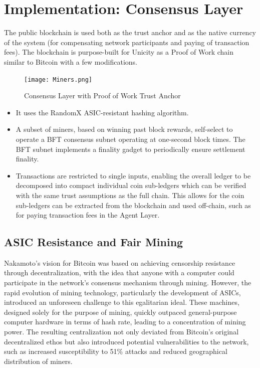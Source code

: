 \documentclass{article}
\begin{document}
\section{Implementation: Consensus Layer}

The public blockchain is used both as the trust anchor and as the native currency of the system (for compensating network participants and paying of transaction fees). The blockchain is purpose-built for Unicity as a Proof of Work chain similar to Bitcoin with a few modifications.

\begin{figure}[htbp]
    \centering
    \texttt{[image: Miners.png]}
    \caption{Consensus Layer with Proof of Work Trust Anchor}
    \label{fig:miners}
\end{figure}

\begin{itemize}
\setlength{\leftmargin}{1em}
 \item It uses the RandomX ASIC-resistant hashing algorithm.
 \item A subset of miners, based on winning past block rewards, self-select to operate a BFT consensus subnet operating at one-second block times. The BFT subnet implements a finality gadget to periodically ensure settlement finality.
 \item Transactions are restricted to single inputs, enabling the overall ledger to be decomposed into compact individual coin sub-ledgers which can be verified with the same trust assumptions as the full chain.  This allows for the coin sub-ledgers can be extracted from the blockchain and used off-chain, such as for paying transaction fees in the Agent Layer.
\end{itemize}


\subsection{ASIC Resistance and Fair Mining}

Nakamoto's vision for Bitcoin was based on achieving censorship resistance through decentralization, with the idea that anyone with a computer could participate in the network's consensus mechanism through mining. However, the rapid evolution of mining technology, particularly the development of ASICs, introduced an unforeseen challenge to this egalitarian ideal. These machines, designed solely for the purpose of mining, quickly outpaced general-purpose computer hardware in terms of hash rate, leading to a concentration of mining power. The resulting centralization not only deviated from Bitcoin's original decentralized ethos but also introduced potential vulnerabilities to the network, such as increased susceptibility to 51\% attacks and reduced geographical distribution of miners.
\end{document}
